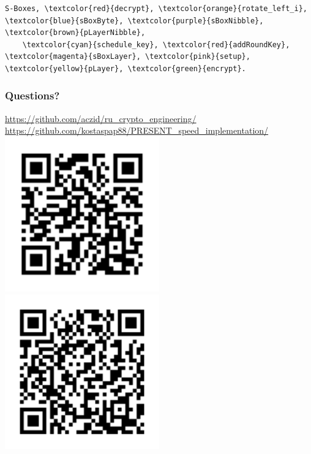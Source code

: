 \documentclass{beamer}
\begin{document}
\begin{frame}[fragile]
\begin{overprint}
{\begin{Verbatim}[commandchars=\\\{\}]
    S-Boxes, \textcolor{red}{decrypt}, \textcolor{orange}{rotate_left_i}, \textcolor{blue}{sBoxByte}, \textcolor{purple}{sBoxNibble}, \textcolor{brown}{pLayerNibble},
    \textcolor{cyan}{schedule_key}, \textcolor{red}{addRoundKey}, \textcolor{magenta}{sBoxLayer}, \textcolor{pink}{setup}, \textcolor{yellow}{pLayer}, \textcolor{green}{encrypt}.
    \end{Verbatim}
}
\end{overprint}
\end{frame}

\begin{frame}[fragile]
\frametitle{Questions?}
	\scriptsize{
	\url{https://github.com/aczid/ru_crypto_engineering/}
	\url{https://github.com/kostaspap88/PRESENT_speed_implementation/}
	}
	\includegraphics[width=0.5\textwidth]{qr_url}
	\includegraphics[width=0.5\textwidth]{qr_url2}
\end{frame}


\end{document}

